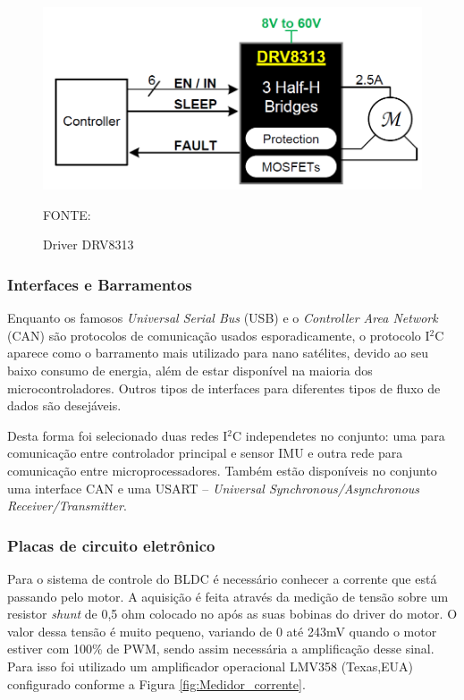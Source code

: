 \documentclass[
	12pt,				%
	openany,			%
	twoside,			%
	a4paper,			%
	english,			%
	french,				%
	spanish,			%
	brazil,				%
	oldfontcommands
	]{abntex2}
\begin{document}
\begin{figure}[th]
	\caption{Driver DRV8313}
	\centering
	\includegraphics[width=0.6\linewidth]{./figs/DRV8313-fig}
	
	\begin{small}
		FONTE: \cite{DRV8313}
	\end{small}
	\label{fig:Driver}
\end{figure}

\newpage

\subsubsection{Interfaces e Barramentos}

Enquanto os famosos \textit{Universal Serial Bus} (USB) e o \textit{Controller Area Network} (CAN) são protocolos de comunicação usados esporadicamente, o protocolo I$^{2}$C aparece como o barramento mais utilizado para nano satélites, devido ao seu baixo consumo de energia, além de estar disponível na maioria dos microcontroladores. Outros tipos de interfaces para diferentes tipos de fluxo de dados são desejáveis. \cite{STATEOFART}

Desta forma foi selecionado duas redes I$^{2}$C independetes no conjunto: uma para comunicação entre controlador principal e sensor IMU e outra rede para comunicação entre microprocessadores. Também estão disponíveis no conjunto uma interface CAN e uma USART – \textit{Universal Synchronous/Asynchronous Receiver/Transmitter}.

\subsubsection{Placas de circuito eletrônico}


Para o sistema de controle do BLDC é necessário conhecer a corrente que está passando pelo motor. A aquisição é feita através da medição de tensão sobre um resistor \textit{shunt} de 0,5 ohm colocado no após as suas bobinas do driver do motor. 
O valor dessa tensão é muito pequeno, variando de 0 até 243mV quando o motor estiver com 100\% de PWM, sendo assim necessária a amplificação desse sinal. 
Para isso foi utilizado um amplificador operacional LMV358 (Texas,EUA) configurado conforme a Figura \ref{fig:Medidor_corrente}.
\end{document}
